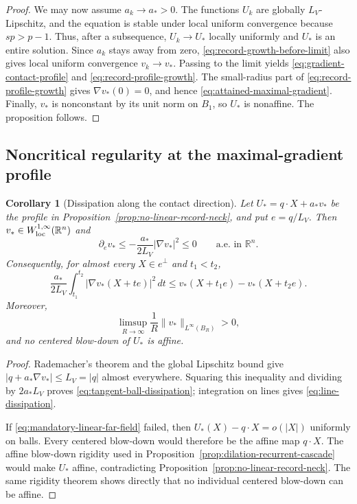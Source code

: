 \documentclass[11pt,reqno]{amsart}
\numberwithin{equation}{section}
\newcommand{\R}{\mathbb R}
\newcommand{\dd}{\,d}
\newtheorem{corollary}[theorem]{Corollary}
\theoremstyle{remark}
\begin{document}
\begin{proof}
We may now assume $a_k\to a_*>0$.  The functions $U_k$ are globally
$L_V$-Lipschitz, and the equation is stable under local uniform convergence
because $sp>p-1$.  Thus, after a subsequence, $U_k\to U_*$ locally uniformly
and $U_*$ is an entire solution.  Since $a_k$ stays away from zero,
\eqref{eq:record-growth-before-limit} also gives local uniform convergence
$v_k\to v_*$.  Passing to the limit yields
\eqref{eq:gradient-contact-profile} and
\eqref{eq:record-profile-growth}.  The small-radius part of
\eqref{eq:record-profile-growth} gives $\nabla v_*(0)=0$, and hence
\eqref{eq:attained-maximal-gradient}.  Finally, $v_*$ is nonconstant by its
unit norm on $B_1$, so $U_*$ is nonaffine.  The proposition follows.
\end{proof}

\subsection{Noncritical regularity at the maximal-gradient profile}
\label{subsec:noncritical-maximal-gradient}

\begin{corollary}[Dissipation along the contact direction]
\label{cor:tangent-ball-dissipation}
Let $U_*=q\cdot X+a_*v_*$ be the profile in
Proposition~\ref{prop:no-linear-record-neck}, and put $e=q/L_V$.  Then
$v_*\in W^{1,\infty}_{\rm loc}(\R^n)$ and
\begin{equation}
 \partial_ev_*
 \le-\frac{a_*}{2L_V}|\nabla v_*|^2\le0
 \qquad\text{a.e. in }\R^n.
 \label{eq:tangent-ball-dissipation}
\end{equation}
Consequently, for almost every $X\in e^\perp$ and $t_1<t_2$,
\begin{equation}
 \frac{a_*}{2L_V}
 \int_{t_1}^{t_2}|\nabla v_*(X+te)|^2\dd t
 \le v_*(X+t_1e)-v_*(X+t_2e).
 \label{eq:line-dissipation}
\end{equation}
Moreover,
\begin{equation}
 \limsup_{R\to\infty}\frac1R
 \|v_*\|_{L^\infty(B_R)}>0,
 \label{eq:mandatory-linear-far-field}
\end{equation}
and no centered blow-down of $U_*$ is affine.
\end{corollary}

\begin{proof}
Rademacher's theorem and the global Lipschitz bound give
$|q+a_*\nabla v_*|\le L_V=|q|$ almost everywhere.  Squaring this inequality
and dividing by $2a_*L_V$ proves
\eqref{eq:tangent-ball-dissipation}; integration on lines gives
\eqref{eq:line-dissipation}.

If \eqref{eq:mandatory-linear-far-field} failed, then
$U_*(X)-q\cdot X=o(|X|)$ uniformly on balls.  Every centered blow-down would
therefore be the affine map $q\cdot X$.  The affine blow-down rigidity used
in Proposition~\ref{prop:dilation-recurrent-cascade} would make $U_*$
affine, contradicting Proposition~\ref{prop:no-linear-record-neck}.  The
same rigidity theorem shows directly that no individual centered blow-down
can be affine.
\end{proof}
\end{document}
